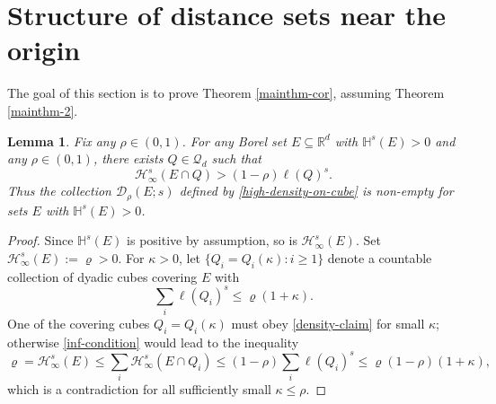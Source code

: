 \documentclass[a4paper,11pt]{amsart}
\newtheorem{lem}[thm]{\bf Lemma}
\numberwithin{equation}{section}
\begin{document}
\section{Structure of distance sets near the origin} \label{Mainthm1-Proof-Section}

The goal of this section is to prove Theorem \ref{mainthm-cor}, assuming Theorem \ref{mainthm-2}. 
\begin{lem} \label{density-lemma}
Fix any $\rho \in (0,1)$. For any Borel set $E \subseteq \mathbb R^d$ with $\mathbb H^s(E) > 0$ and any $\rho \in (0,1)$, there exists $Q \in \mathcal Q_d$ such that
\begin{equation} \mathcal H^s_{\infty}(E \cap Q) > (1- \rho) \ell(Q)^s.  \label{density-claim} \end{equation}
Thus the collection $\mathcal D_{\rho}(E;s)$ defined by \eqref{high-density-on-cube} is non-empty for sets $E$ with $\mathbb H^s(E) > 0$. 
\end{lem} 
\begin{proof} Since $\mathbb H^s(E)$ is positive by assumption, so is $\mathcal H^s_{\infty}(E)$. Set $\mathcal H^s_{\infty}(E) := \varrho > 0$. For $\kappa > 0$, let $\{Q_i = Q_i(\kappa) : i \geq 1\}$ denote a countable collection of dyadic cubes covering $E$ with    
\begin{equation} \label{inf-condition} \sum_i \ell(Q_i)^s \leq \varrho(1 + \kappa). \end{equation} 
One of the covering cubes $Q_i = Q_i(\kappa)$ must obey \eqref{density-claim} for small $\kappa$; otherwise \eqref{inf-condition} would lead to the inequality  
 \[ \varrho = \mathcal H_{\infty}^s(E) \leq \sum_i \mathcal H_{\infty}^s(E \cap Q_i) \leq (1 - \rho) \sum_i \ell(Q_i)^s \leq \varrho (1 - \rho)(1 + \kappa), \]
 which is a contradiction for all sufficiently small $\kappa \leq \rho$.  
 \end{proof} 
\end{document}
